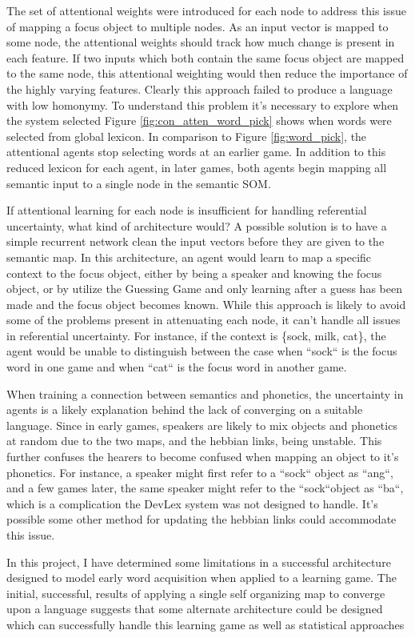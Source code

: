 \documentclass[a4paper,11pt]{article}
\begin{document}
The set of attentional weights were introduced for each node to address this
issue of mapping a focus object to multiple nodes.  As an input vector is mapped
to some node, the attentional weights should track how much change is present
in each feature.  If two inputs which both contain the same focus object are
mapped to the same node, this attentional weighting would then reduce the
importance of the highly varying features.  Clearly this approach failed to
produce a language with low homonymy.  To understand this problem it's necessary
to explore when the system selected Figure \ref{fig:con_atten_word_pick} shows
when words were selected from global lexicon.  In comparison to Figure
\ref{fig:word_pick}, the attentional agents stop selecting words at an earlier
game.  In addition to this reduced lexicon for each agent, in later games, both
agents begin mapping all semantic input to a single node in the semantic SOM.

If attentional learning for each node is insufficient for handling referential
uncertainty, what kind of architecture would?  A possible solution is to have a
simple recurrent network clean the input vectors before they are given to the
semantic map.  In this architecture, an agent would learn to map a specific
context to the focus object, either by being a speaker and knowing the focus
object, or by utilize the Guessing Game and only learning after a guess has been
made and the focus object becomes known.  While this approach is likely to avoid
some of the problems present in attenuating each node, it can't handle all
issues in referential uncertainty.  For instance, if the context is \{sock,
milk, cat\}, the agent would be unable to distinguish between the case when
``sock`` is the focus word in one game and when ``cat`` is the focus word in
another game.

When training a connection between semantics and phonetics, the uncertainty in
agents is a likely explanation behind the lack of converging on a suitable
language.  Since in early games, speakers are likely to mix objects and phonetics
at random due to the two maps, and the hebbian links, being unstable.  This
further confuses the hearers to become confused when mapping an object to it's
phonetics.  For instance, a speaker might first refer to a ``sock`` object as ``ang``,
and a few games later, the same speaker might refer to the ``sock``object as
``ba``, which is a complication the DevLex system was not designed to handle.
It's possible some other method for updating the hebbian links could 
accommodate this issue.

In this project, I have determined some limitations in a successful architecture
designed to model early word acquisition when applied to a learning game.  The
initial, successful, results of applying a single self organizing map to converge
upon a language suggests that some alternate architecture could be designed
which can successfully handle this learning game as well as statistical
approaches 
 
\end{document}
